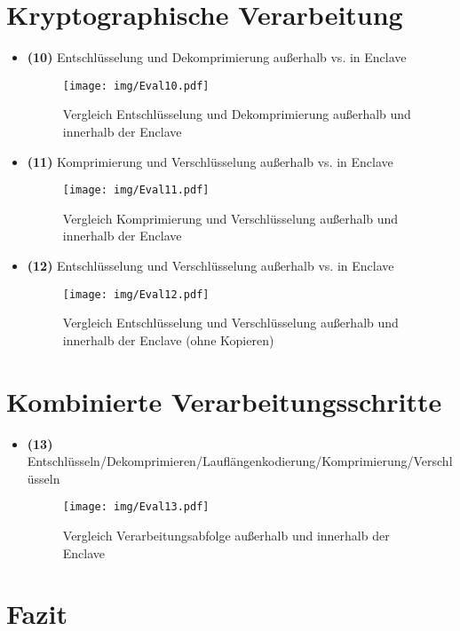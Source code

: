 \section{Kryptographische Verarbeitung}
\begin{itemize}
	
	\item \textbf{(10)} Entschlüsselung und Dekomprimierung außerhalb vs. in Enclave
	\begin{figure}[h]
		\texttt{[image: img/Eval10.pdf]}
		\centering
		\caption{Vergleich Entschlüsselung und Dekomprimierung außerhalb und innerhalb der Enclave}
		\label{fig:eval10}
	\end{figure}
	
	\item \textbf{(11)} Komprimierung und Verschlüsselung außerhalb vs. in Enclave
	\begin{figure}[h]
		\texttt{[image: img/Eval11.pdf]}
		\centering
		\caption{Vergleich Komprimierung und Verschlüsselung außerhalb und innerhalb der Enclave}
		\label{fig:eval11}
	\end{figure}
	
	\item \textbf{(12)} Entschlüsselung und Verschlüsselung außerhalb vs. in Enclave
	\begin{figure}[h]
		\texttt{[image: img/Eval12.pdf]}
		\centering
		\caption{Vergleich Entschlüsselung und Verschlüsselung außerhalb und innerhalb der Enclave (ohne Kopieren)}
		\label{fig:eval12}
	\end{figure}
\end{itemize}
\section{Kombinierte Verarbeitungsschritte}

\begin{itemize}
	\item \textbf{(13)} Entschlüsseln/Dekomprimieren/Lauflängenkodierung/Komprimierung/Verschlüsseln
	\begin{figure}[h]
		\texttt{[image: img/Eval13.pdf]}
		\centering
		\caption{Vergleich Verarbeitungsabfolge außerhalb und innerhalb der Enclave}
		\label{fig:eval13}
	\end{figure}

\end{itemize}

\section{Fazit}
